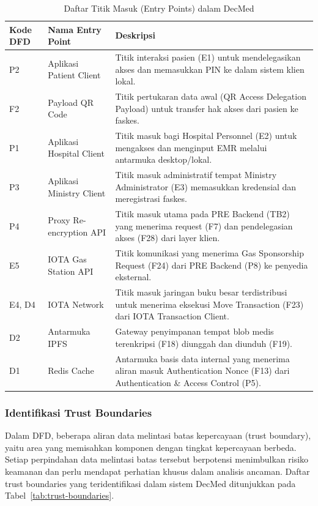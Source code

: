 \begin{table}[htbp]
    \centering
    \caption{Daftar Titik Masuk (Entry Points) dalam DecMed}
    \vspace{0.25cm}
    \label{tab:entry-points}
    \begin{tabular}{|p{2.5cm}|p{3.5cm}|p{8cm}|}
        \hline
        \textbf{Kode DFD} & \textbf{Nama Entry Point} & \textbf{Deskripsi} \\
        \hline
        P2 & Aplikasi Patient Client & Titik interaksi pasien (E1) untuk mendelegasikan akses dan memasukkan PIN ke dalam sistem klien lokal. \\
        \hline
        F2 & Payload QR Code & Titik pertukaran data awal (QR Access Delegation Payload) untuk transfer hak akses dari pasien ke faskes. \\
        \hline
        P1 & Aplikasi Hospital Client & Titik masuk bagi Hospital Personnel (E2) untuk mengakses dan menginput EMR melalui antarmuka desktop/lokal. \\
        \hline
        P3 & Aplikasi Ministry Client & Titik masuk administratif tempat Ministry Administrator (E3) memasukkan kredensial dan meregistrasi faskes. \\
        \hline
        P4 & Proxy Re-encryption API & Titik masuk utama pada PRE Backend (TB2) yang menerima request (F7) dan pendelegasian akses (F28) dari layer klien. \\
        \hline
        E5 & IOTA Gas Station API & Titik komunikasi yang menerima Gas Sponsorship Request (F24) dari PRE Backend (P8) ke penyedia eksternal. \\
        \hline
        E4, D4 & IOTA Network & Titik masuk jaringan buku besar terdistribusi untuk menerima eksekusi Move Transaction (F23) dari IOTA Transaction Client. \\
        \hline
        D2 & Antarmuka IPFS & Gateway penyimpanan tempat blob medis terenkripsi (F18) diunggah dan diunduh (F19). \\
        \hline
        D1 & Redis Cache & Antarmuka basis data internal yang menerima aliran masuk Authentication Nonce (F13) dari Authentication \& Access Control (P5). \\
        \hline
    \end{tabular}
\end{table}

\subsubsection{Identifikasi Trust Boundaries}
Dalam DFD, beberapa aliran data melintasi batas kepercayaan (trust boundary), yaitu area yang memisahkan komponen dengan tingkat kepercayaan berbeda. Setiap perpindahan data melintasi batas tersebut berpotensi menimbulkan risiko keamanan dan perlu mendapat perhatian khusus dalam analisis ancaman. Daftar trust boundaries yang teridentifikasi dalam sistem DecMed ditunjukkan pada Tabel~\ref{tab:trust-boundaries}.

